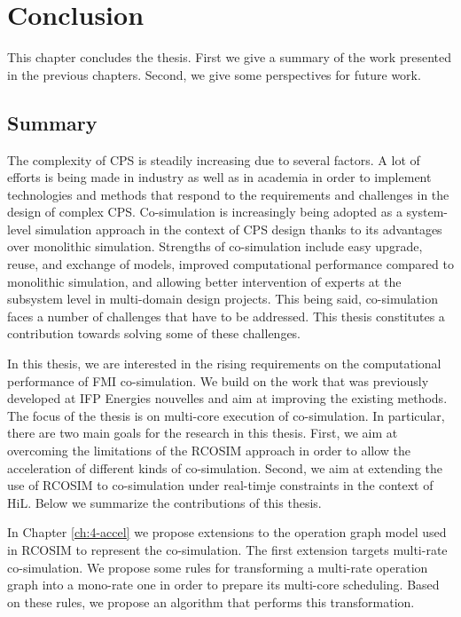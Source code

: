 \chapter{\label{ch:7-concl}Conclusion} 

\minitoc

This chapter concludes the thesis. First we give a summary of the work presented in the previous chapters. Second, we give some perspectives for future work.

\section{Summary}

The complexity of CPS is steadily increasing due to several factors. A lot of efforts is being made in industry as well as in academia in order to implement technologies and methods that respond to the requirements and challenges in the design of complex CPS. Co-simulation is increasingly being adopted as a system-level simulation approach in the context of CPS design thanks to its advantages over monolithic simulation. Strengths of co-simulation include easy upgrade, reuse, and exchange of models, improved computational performance compared to monolithic simulation, and allowing better intervention of experts at the subsystem level in multi-domain design projects. This being said, co-simulation faces a number of challenges that have to be addressed. This thesis constitutes a contribution towards solving some of these challenges.   

In this thesis, we are interested in the rising requirements on the computational performance of FMI co-simulation. We build on the work that was previously developed at IFP Energies nouvelles and aim at improving the existing methods. The focus of the thesis is on multi-core execution of co-simulation. In particular, there are two main goals for the research in this thesis. First, we aim at overcoming the limitations of the RCOSIM approach in order to allow the acceleration of different kinds of co-simulation. Second, we aim at extending the use of RCOSIM to co-simulation under real-timje constraints in the context of HiL. Below we summarize the contributions of this thesis.

In Chapter \ref{ch:4-accel} we propose extensions to the operation graph model used in RCOSIM to represent the co-simulation. The first extension targets multi-rate co-simulation. We propose some rules for transforming a multi-rate operation graph into a mono-rate one in order to prepare its multi-core scheduling. Based on these rules, we propose an algorithm that performs this transformation.

